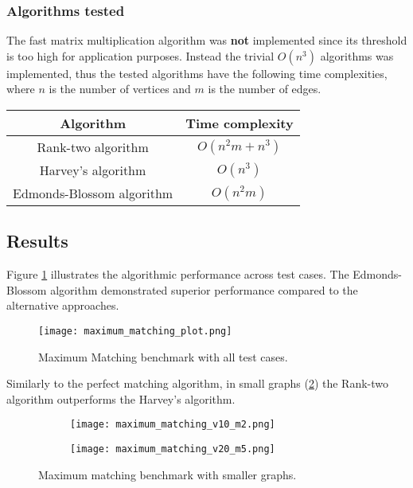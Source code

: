 \subsubsection{Algorithms tested}
The fast matrix multiplication algorithm was \textbf{not} implemented since its threshold is too high for application purposes.
Instead the trivial $O(n^3)$ algorithms was implemented, thus the tested algorithms have the following time complexities, where \(n\) is the number of vertices and \(m\) is the number of edges.
\begin{center}
  \begin{tabular}{|c|c|}
    \hline
    Algorithm & Time complexity \\
    \hline
    Rank-two algorithm & \(O(n^2m + n^3)\) \\
    Harvey's algorithm & \(O(n^3)\) \\
    Edmonds-Blossom algorithm & \(O(n^2m)\) \\
    \hline
  \end{tabular}
\end{center}

\subsection{Results}
\label{results:max_matching}

Figure \cref{fig:max_matching} illustrates the algorithmic performance across test cases. 
The Edmonds-Blossom algorithm demonstrated superior performance compared to the alternative approaches.

\begin{figure}[H]
  \centering
  \texttt{[image: maximum\_matching\_plot.png]}
  \caption{Maximum Matching benchmark with all test cases.}
  \label{fig:max_matching}
\end{figure}

Similarly to the perfect matching algorithm, in small graphs (\cref{fig:v10m2-v20m5}) the Rank-two algorithm outperforms the Harvey's algorithm.

\begin{figure}[H]
  \centering
  \begin{subfigure}{.5\textwidth}
    \centering
    \texttt{[image: maximum\_matching\_v10\_m2.png]}
  \end{subfigure}%
  \begin{subfigure}{.5\textwidth}
    \centering
    \texttt{[image: maximum\_matching\_v20\_m5.png]}
  \end{subfigure}
  \caption{Maximum matching benchmark with smaller graphs.}
  \label{fig:v10m2-v20m5}
\end{figure}

